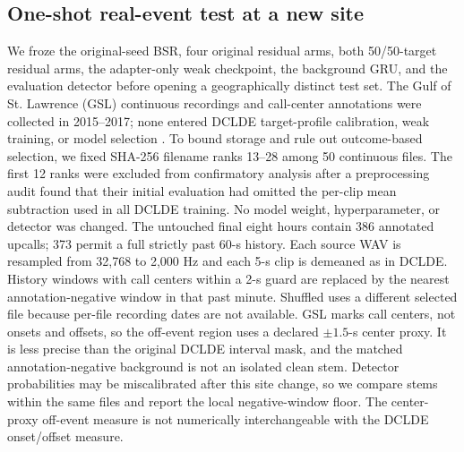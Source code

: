 \documentclass[conference]{IEEEtran}
\begin{document}
\subsection{One-shot real-event test at a new site}
We froze the original-seed BSR, four original residual arms, both
50/50-target residual arms, the adapter-only weak checkpoint, the background
GRU, and the evaluation detector before opening a geographically distinct
test set. The Gulf of St. Lawrence (GSL) continuous recordings and call-center
annotations were collected in 2015--2017; none entered DCLDE target-profile
calibration, weak training, or model selection
\cite{kirsebom2020gslData,kirsebom2020gsl}. To bound storage and rule out
outcome-based selection, we fixed SHA-256 filename ranks 13--28 among 50
continuous files. The first 12 ranks were excluded from confirmatory analysis
after a preprocessing audit found that their initial evaluation had omitted
the per-clip mean subtraction used in all DCLDE training. No model weight,
hyperparameter, or detector was changed. The untouched final eight hours
contain 386 annotated upcalls; 373
permit a full strictly past 60-s history. Each source WAV is resampled from
32,768 to 2,000 Hz and each 5-s clip is demeaned as in DCLDE.
History windows with call centers within a 2-s guard
are replaced by the nearest annotation-negative window in that past minute.
Shuffled uses a different selected file because per-file recording dates are
not available. GSL marks call centers, not onsets and offsets, so the
off-event region uses a declared $\pm1.5$-s center proxy. It is less precise
than the original DCLDE interval mask, and the matched annotation-negative
background is not an isolated clean stem.
Detector probabilities may be miscalibrated after this site change, so we
compare stems within the same files and report the local negative-window floor.
The center-proxy off-event measure is not numerically interchangeable with
the DCLDE onset/offset measure.
\end{document}
